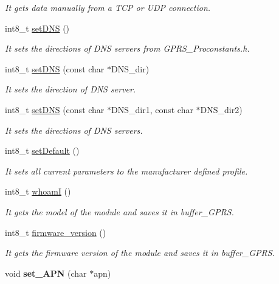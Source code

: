 \begin{DoxyCompactItemize}
\begin{DoxyCompactList}\small\item\em It gets data manually from a T\+CP or U\+DP connection. \end{DoxyCompactList}\item 
int8\+\_\+t \hyperlink{class_wasp_g_p_r_s___pro__core_a12d31906378b98aac24a691243f0851e}{set\+D\+NS} ()
\begin{DoxyCompactList}\small\item\em It sets the directions of D\+NS servers from G\+P\+R\+S\+\_\+\+Proconstants.\+h. \end{DoxyCompactList}\item 
int8\+\_\+t \hyperlink{class_wasp_g_p_r_s___pro__core_aac394af71e7b50cac89c1786823070ff}{set\+D\+NS} (const char $\ast$D\+N\+S\+\_\+dir)
\begin{DoxyCompactList}\small\item\em It sets the direction of D\+NS server. \end{DoxyCompactList}\item 
int8\+\_\+t \hyperlink{class_wasp_g_p_r_s___pro__core_a2e48d1533a7b13b508258337fd7d9e1d}{set\+D\+NS} (const char $\ast$D\+N\+S\+\_\+dir1, const char $\ast$D\+N\+S\+\_\+dir2)
\begin{DoxyCompactList}\small\item\em It sets the directions of D\+NS servers. \end{DoxyCompactList}\item 
int8\+\_\+t \hyperlink{class_wasp_g_p_r_s___pro__core_a79998c55c1820cb4a9c917118e4e7390}{set\+Default} ()
\begin{DoxyCompactList}\small\item\em It sets all current parameters to the manufacturer defined profile. \end{DoxyCompactList}\item 
int8\+\_\+t \hyperlink{class_wasp_g_p_r_s___pro__core_a366b0d3817b9156c065d113edc2acc01}{whoamI} ()
\begin{DoxyCompactList}\small\item\em It gets the model of the module and saves it in \textquotesingle{}buffer\+\_\+\+G\+P\+RS\textquotesingle{}. \end{DoxyCompactList}\item 
int8\+\_\+t \hyperlink{class_wasp_g_p_r_s___pro__core_af7842ab06b765667e2d924ccf5edf80d}{firmware\+\_\+version} ()
\begin{DoxyCompactList}\small\item\em It gets the firmware version of the module and saves it in \textquotesingle{}buffer\+\_\+\+G\+P\+RS\textquotesingle{}. \end{DoxyCompactList}\item 
void {\bfseries set\+\_\+\+A\+PN} (char $\ast$apn)\hypertarget{class_wasp_g_p_r_s___pro__core_a18dd7c25f060b56022b90d705799612a}{}\label{class_wasp_g_p_r_s___pro__core_a18dd7c25f060b56022b90d705799612a}


\end{DoxyCompactItemize}
